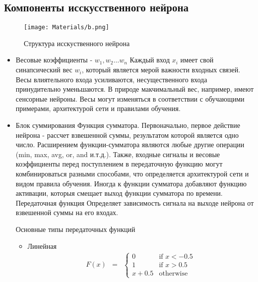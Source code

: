 		\subsection{Компоненты исскусственного нейрона}
			\begin{figure}[h!]
			\centering
			\texttt{[image: Materials/b.png]}
			\caption{Структура исскуственного нейрона}
			\end{figure}
    		\begin{itemize}
    		        \item Весовые коэффициенты - $w_1, w_2 \dots w_n$
    				Каждый вход $x_i$ имеет свой синапсический вес $w_i$, который является мерой
    				важности входных связей. Весы влиятельного входа усиливаются, несущественного 
    				входа принудительно уменьшаются. В природе макчимальный вес, например, имеют сенсорные 
    				нейроны. Весы могут изменяться в соответствии с обучающими примерами, архитектурой сети 
    				и правилами обучения. 
    			    \item Блок суммирования
    				Функция сумматора. Первоначально, первое действие нейрона - рассчет взвешенной суммы, результатом
    				которой является одно число. Расширением функции-сумматора являются любые другие операции (min, max,
    				avg, or, and и.т.д.). Также, входные сигналы и весовые коэффициенты перед поступлением в передаточную 
    				функцию могут комбинироваться разными способами, что определяется архитектурой сети и видом правила
    				обучения.  Иногда к функции сумматора добавляют функцию активации, которыя смещает выход функции сумматора 
    				по времени. 
    			    Передаточная функция 
    				Определяет зависимость сигнала на выходе нейрона от взвешенной суммы на его входах.
    				
    				Основные типы передаточных функций
    				\begin{itemize}
    				\item Линейная
    					\begin{equation}
                            \begin{matrix}
                            F(x) & =
                            & \left\{
                            \begin{matrix}
                            0 & \mbox{if } x < -0.5\\
                            1 & \mbox{if } x > 0.5\\
                            x + 0.5 & \mbox{otherwise }
                            \end{matrix} \right.
                            \end{matrix}
                        \end{equation}
                        

\end{itemize}
\end{itemize}
